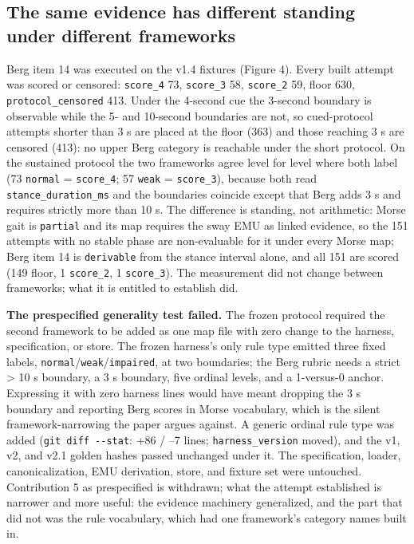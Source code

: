 \documentclass[11pt]{article}
\begin{document}
\subsection{The same evidence has different standing under different frameworks}\label{the-same-evidence-has-different-standing-under-different-frameworks}

Berg item 14 was executed on the v1.4 fixtures (Figure 4). Every built attempt was scored or censored: \texttt{score\_4} 73, \texttt{score\_3} 58, \texttt{score\_2} 59, floor 630, \texttt{protocol\_censored} 413. Under the 4-second cue the 3-second boundary is observable while the 5- and 10-second boundaries are not, so cued-protocol attempts shorter than 3 s are placed at the floor (363) and those reaching 3 s are censored (413): no upper Berg category is reachable under the short protocol. On the sustained protocol the two frameworks agree level for level where both label (73 \texttt{normal} = \texttt{score\_4}; 57 \texttt{weak} = \texttt{score\_3}), because both read \texttt{stance\_duration\_ms} and the boundaries coincide except that Berg adds 3 s and requires strictly more than 10 s. The difference is standing, not arithmetic: Morse gait is \texttt{partial} and its map requires the sway EMU as linked evidence, so the 151 attempts with no stable phase are non-evaluable for it under every Morse map; Berg item 14 is \texttt{derivable} from the stance interval alone, and all 151 are scored (149 floor, 1 \texttt{score\_2}, 1 \texttt{score\_3}). The measurement did not change between frameworks; what it is entitled to establish did.

\textbf{The prespecified generality test failed.} The frozen protocol required the second framework to be added as one map file with zero change to the harness, specification, or store. The frozen harness's only rule type emitted three fixed labels, \texttt{normal}/\texttt{weak}/\texttt{impaired}, at two boundaries; the Berg rubric needs a strict \textgreater{} 10 s boundary, a 3 s boundary, five ordinal levels, and a 1-versus-0 anchor. Expressing it with zero harness lines would have meant dropping the 3 s boundary and reporting Berg scores in Morse vocabulary, which is the silent framework-narrowing the paper argues against. A generic ordinal rule type was added (\texttt{git\ diff\ -\/-stat}: +86 / --7 lines; \texttt{harness\_version} moved), and the v1, v2, and v2.1 golden hashes passed unchanged under it. The specification, loader, canonicalization, EMU derivation, store, and fixture set were untouched. Contribution 5 as prespecified is withdrawn; what the attempt established is narrower and more useful: the evidence machinery generalized, and the part that did not was the rule vocabulary, which had one framework's category names built in.
\end{document}
